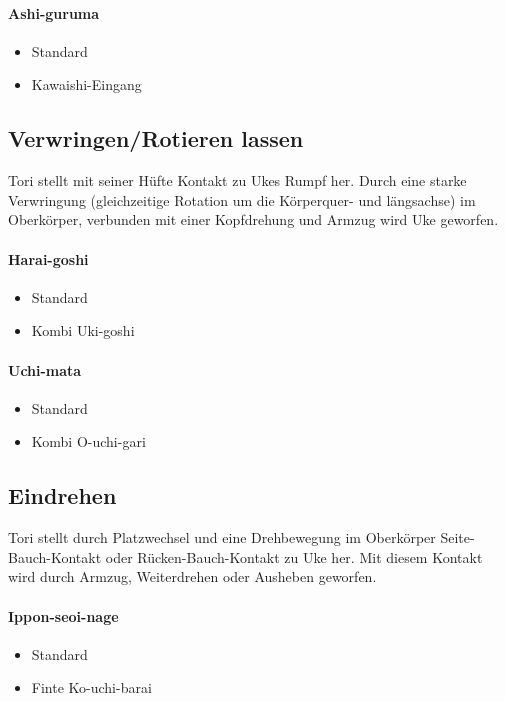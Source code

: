 \documentclass[justified, a4paper, notitlepage, captions=tableheading, nobib]{tufte-handout}
\begin{document}
\paragraph{Ashi-guruma }
\label{sec:orgab7cc46}
\begin{itemize}
\item Standard
\item Kawaishi-Eingang
\end{itemize}

\subsection{Verwringen/Rotieren lassen }
\label{sec:org0186bc2}
Tori stellt mit seiner Hüfte Kontakt zu Ukes Rumpf her. Durch eine starke Verwringung (gleichzeitige Rotation um die Körperquer- und längsachse) im Oberkörper, verbunden mit einer Kopfdrehung und Armzug wird Uke geworfen.

\paragraph{Harai-goshi }
\label{sec:orgecdb0f8}
\begin{itemize}
\item Standard
\item Kombi Uki-goshi
\end{itemize}

\paragraph{Uchi-mata }
\label{sec:org80d550f}
\begin{itemize}
\item Standard
\item Kombi O-uchi-gari
\end{itemize}

\subsection{Eindrehen }
\label{sec:org32c47ea}
Tori stellt durch Platzwechsel und eine Drehbewegung im Oberkörper Seite-Bauch-Kontakt oder Rücken-Bauch-Kontakt zu Uke her. Mit diesem Kontakt wird durch Armzug, Weiterdrehen oder Ausheben geworfen.

\paragraph{Ippon-seoi-nage }
\label{sec:org2073f51}
\begin{itemize}
\item Standard
\item Finte Ko-uchi-barai
\end{itemize}
\end{document}
